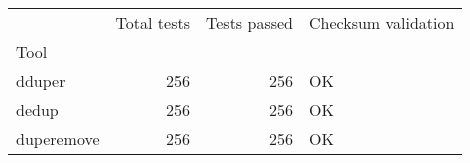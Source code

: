 \begin{tabular}{lrrl}
\toprule
 & Total tests & Tests passed & Checksum validation \\
Tool &  &  &  \\
\midrule
dduper & 256 & 256 & OK \\
dedup & 256 & 256 & OK \\
duperemove & 256 & 256 & OK \\
\bottomrule
\end{tabular}
